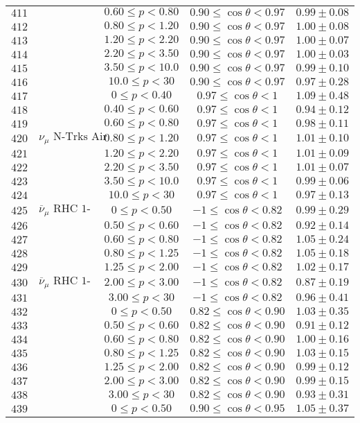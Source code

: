 \begin{longtable}[c]{ccccc}
$411$ &  & $0.60\leq p<0.80$ & $0.90\leq\cos\theta<0.97$ & $0.99\pm0.08$\tabularnewline
$412$ &  & $0.80\leq p<1.20$ & $0.90\leq\cos\theta<0.97$ & $1.00\pm0.08$\tabularnewline
$413$ &  & $1.20\leq p<2.20$ & $0.90\leq\cos\theta<0.97$ & $1.00\pm0.07$\tabularnewline
$414$ &  & $2.20\leq p<3.50$ & $0.90\leq\cos\theta<0.97$ & $1.00\pm0.03$\tabularnewline
$415$ &  & $3.50\leq p<10.0$ & $0.90\leq\cos\theta<0.97$ & $0.99\pm0.10$\tabularnewline
$416$ &  & $10.0\leq p<30$ & $0.90\leq\cos\theta<0.97$ & $0.97\pm0.28$\tabularnewline
$417$ &  & $0\leq p<0.40$ & $0.97\leq\cos\theta<1$ & $1.09\pm0.48$\tabularnewline
$418$ &  & $0.40\leq p<0.60$ & $0.97\leq\cos\theta<1$ & $0.94\pm0.12$\tabularnewline
$419$ &  & $0.60\leq p<0.80$ & $0.97\leq\cos\theta<1$ & $0.98\pm0.11$\tabularnewline
$420$ & $\nu_{\mu}\text{ N-Trks Air}$ & $0.80\leq p<1.20$ & $0.97\leq\cos\theta<1$ & $1.01\pm0.10$\tabularnewline
$421$ &  & $1.20\leq p<2.20$ & $0.97\leq\cos\theta<1$ & $1.01\pm0.09$\tabularnewline
$422$ &  & $2.20\leq p<3.50$ & $0.97\leq\cos\theta<1$ & $1.01\pm0.07$\tabularnewline
$423$ &  & $3.50\leq p<10.0$ & $0.97\leq\cos\theta<1$ & $0.99\pm0.06$\tabularnewline
$424$ &  & $10.0\leq p<30$ & $0.97\leq\cos\theta<1$ & $0.97\pm0.13$\tabularnewline
$425$ & $\overline{\nu}_{\mu}\text{ RHC 1-Trk Air}$ & $0\leq p<0.50$ & $-1\leq\cos\theta<0.82$ & $0.99\pm0.29$\tabularnewline
$426$ &  & $0.50\leq p<0.60$ & $-1\leq\cos\theta<0.82$ & $0.92\pm0.14$\tabularnewline
$427$ &  & $0.60\leq p<0.80$ & $-1\leq\cos\theta<0.82$ & $1.05\pm0.24$\tabularnewline
$428$ &  & $0.80\leq p<1.25$ & $-1\leq\cos\theta<0.82$ & $1.05\pm0.18$\tabularnewline
$429$ &  & $1.25\leq p<2.00$ & $-1\leq\cos\theta<0.82$ & $1.02\pm0.17$\tabularnewline
$430$ & $\overline{\nu}_{\mu}\text{ RHC 1-Trk Air}$ & $2.00\leq p<3.00$ & $-1\leq\cos\theta<0.82$ & $0.87\pm0.19$\tabularnewline
$431$ &  & $3.00\leq p<30$ & $-1\leq\cos\theta<0.82$ & $0.96\pm0.41$\tabularnewline
$432$ &  & $0\leq p<0.50$ & $0.82\leq\cos\theta<0.90$ & $1.03\pm0.35$\tabularnewline
$433$ &  & $0.50\leq p<0.60$ & $0.82\leq\cos\theta<0.90$ & $0.91\pm0.12$\tabularnewline
$434$ &  & $0.60\leq p<0.80$ & $0.82\leq\cos\theta<0.90$ & $1.00\pm0.16$\tabularnewline
$435$ &  & $0.80\leq p<1.25$ & $0.82\leq\cos\theta<0.90$ & $1.03\pm0.15$\tabularnewline
$436$ &  & $1.25\leq p<2.00$ & $0.82\leq\cos\theta<0.90$ & $0.99\pm0.12$\tabularnewline
$437$ &  & $2.00\leq p<3.00$ & $0.82\leq\cos\theta<0.90$ & $0.99\pm0.15$\tabularnewline
$438$ &  & $3.00\leq p<30$ & $0.82\leq\cos\theta<0.90$ & $0.93\pm0.31$\tabularnewline
$439$ &  & $0\leq p<0.50$ & $0.90\leq\cos\theta<0.95$ & $1.05\pm0.37$\tabularnewline

\end{longtable}
